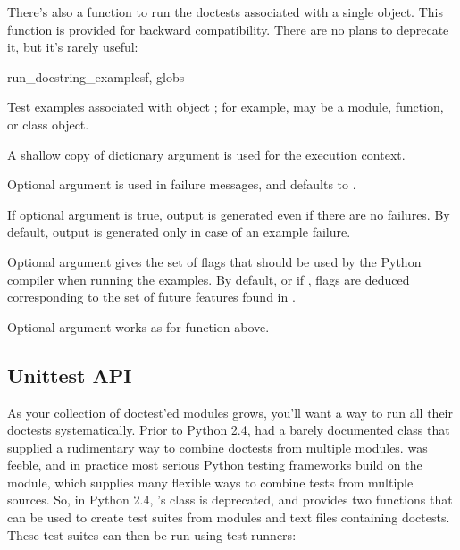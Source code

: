There's also a function to run the doctests associated with a single object.
This function is provided for backward compatibility.  There are no plans
to deprecate it, but it's rarely useful:

\begin{funcdesc}{run_docstring_examples}{f, globs}

  Test examples associated with object ; for example,  may
  be a module, function, or class object.

  A shallow copy of dictionary argument  is used for the
  execution context.

  Optional argument  is used in failure messages, and defaults
  to .

  If optional argument  is true, output is generated even
  if there are no failures.  By default, output is generated only in case
  of an example failure.

  Optional argument  gives the set of flags that should
  be used by the Python compiler when running the examples.  By default, or
  if , flags are deduced corresponding to the set of future
  features found in .

  Optional argument  works as for function
   above.
\end{funcdesc}

\subsection{Unittest API\label{doctest-unittest-api}}

As your collection of doctest'ed modules grows, you'll want a way to run
all their doctests systematically.  Prior to Python 2.4, 
had a barely documented  class that supplied a rudimentary
way to combine doctests from multiple modules.  was feeble,
and in practice most serious Python testing frameworks build on the
 module, which supplies many flexible ways to combine
tests from multiple sources.  So, in Python 2.4, 's
 class is deprecated, and  provides two
functions that can be used to create  test suites from
modules and text files containing doctests.  These test suites can then be
run using  test runners:

